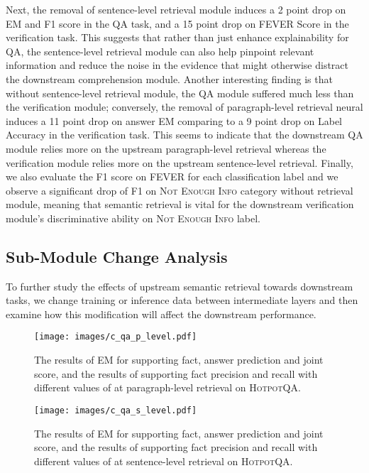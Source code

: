 \documentclass[11pt,a4paper]{article}
\newcommand\fever{FEVER\xspace}
\newcommand\hpqa{\textsc{HotpotQA}\xspace}
\begin{document}
Next, the removal of sentence-level retrieval module induces a 2 point drop on EM and F1 score in the QA task, and a 15 point drop on FEVER Score in the verification task. This suggests that rather than just enhance explainability for QA, the sentence-level retrieval module can also help pinpoint relevant information and reduce the noise in the evidence that might otherwise distract the downstream comprehension module. Another interesting finding is that without sentence-level retrieval module, the QA module suffered much less than the verification module; 
conversely, the removal of paragraph-level retrieval neural induces a 11 point drop on answer EM comparing to a 9 point drop on Label Accuracy in the verification task.
This seems to indicate that the downstream QA module relies more on the upstream paragraph-level retrieval whereas the verification module relies more on the upstream sentence-level retrieval.
Finally, we also evaluate the F1 score on \fever for each classification label and we observe a significant drop of F1 on \textsc{Not Enough Info} category without retrieval module, meaning that semantic retrieval is vital for the downstream verification module's discriminative ability on \textsc{Not Enough Info} label.


\subsection{Sub-Module Change Analysis}
To further study the effects of upstream semantic retrieval towards downstream tasks, we change training or inference data between intermediate layers and then examine how this modification will affect the downstream performance.

\begin{figure}[t]
	\centering
    \texttt{[image: images/c\_qa\_p\_level.pdf]}
    \vspace{-7pt}
    \caption{The results of EM for supporting fact, answer prediction and joint score, and the results of supporting fact precision and recall with different values of  at paragraph-level retrieval on \hpqa.
    \label{fig:hpqa_p_level_effects}
}
\vspace{-10pt}
\end{figure}

\begin{figure}[t]
	\centering
    \texttt{[image: images/c\_qa\_s\_level.pdf]}
    \vspace{-5pt}
    \caption{The results of EM for supporting fact, answer prediction and joint score, and the results of supporting fact precision and recall with different values of  at sentence-level retrieval on \hpqa.
    \label{fig:hpqa_s_level_effects}}
    \vspace{-5pt}
\end{figure}
\end{document}
